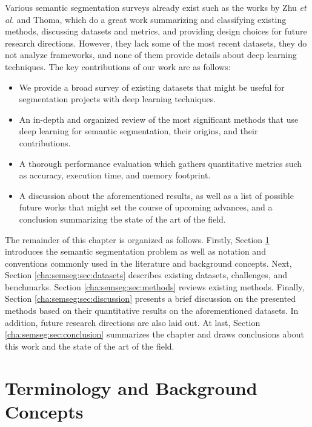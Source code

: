 Various semantic segmentation surveys already exist such as the works by Zhu \emph{et al.}\cite{Zhu2016} and Thoma\cite{Thoma2016}, which do a great work summarizing and classifying existing methods, discussing datasets and metrics, and providing design choices for future research directions. However, they lack some of the most recent datasets, they do not analyze frameworks, and none of them provide details about deep learning techniques. The key contributions of our work are as follows:

\begin{itemize}
	\item We provide a broad survey of existing datasets that might be useful for segmentation projects with deep learning techniques.
	\item An in-depth and organized review of the most significant methods that use deep learning for semantic segmentation, their origins, and their contributions.
	\item A thorough performance evaluation which gathers quantitative metrics such as accuracy, execution time, and memory footprint.
	\item A discussion about the aforementioned results, as well as a list of possible future works that might set the course of upcoming advances, and a conclusion summarizing the state of the art of the field.
\end{itemize}

The remainder of this chapter is organized as follows. Firstly, Section \ref{cha:semseg:sec:background} introduces the semantic segmentation problem as well as notation and conventions commonly used in the literature and background concepts. Next, Section \ref{cha:semseg:sec:datasets} describes existing datasets, challenges, and benchmarks. Section \ref{cha:semseg:sec:methods} reviews existing methods. Finally, Section \ref{cha:semseg:sec:discussion} presents a brief discussion on the presented methods based on their quantitative results on the aforementioned datasets. In addition, future research directions are also laid out. At last, Section \ref{cha:semseg:sec:conclusion} summarizes the chapter and draws conclusions about this work and the state of the art of the field.

\section{Terminology and Background Concepts}
\label{cha:semseg:sec:background}


